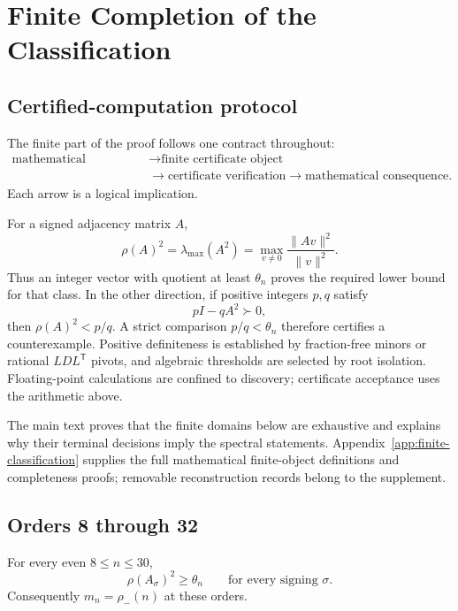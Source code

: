 \section{Finite Completion of the Classification}
\label{sec:finite-completion}

\subsection{Certified-computation protocol}
\label{subsec:exact-computation-protocol}

The finite part of the proof follows one contract throughout:
\[
\begin{aligned}
\text{mathematical reduction}
&\longrightarrow \text{finite certificate object}\\
&\longrightarrow \text{certificate verification}
\longrightarrow \text{mathematical consequence}.
\end{aligned}
\]
Each arrow is a logical implication.

For a signed adjacency matrix \(A\),
\[
\rho(A)^2=\lambda_{\max}(A^2)
=\max_{v\neq0}\frac{\|Av\|^2}{\|v\|^2}.
\]
Thus an integer vector with quotient at least \(\theta_n\) proves the
required lower bound for that class.  In the other direction, if positive
integers \(p,q\) satisfy
\[
pI-qA^2\succ0,
\]
then \(\rho(A)^2<p/q\). A strict comparison
\(p/q<\theta_n\) therefore certifies a counterexample.  Positive
definiteness is established by fraction-free minors or rational
\(LDL^{\mathsf T}\) pivots, and algebraic thresholds are selected by
root isolation. Floating-point calculations are confined to discovery;
certificate acceptance uses the arithmetic above.

The main text proves that the finite domains below are exhaustive and
explains why their terminal decisions imply the spectral statements.
Appendix~\ref{app:finite-classification} supplies the full mathematical
finite-object definitions and completeness proofs; removable reconstruction
records belong to the supplement.

\subsection{Orders 8 through 32}
\label{subsec:orders-8-32}

\begin{proposition}\label{prop:orders-8-30}
For every even \(8\leq n\leq30\),
\[
\rho(A_\sigma)^2\geq\theta_n
\qquad\text{for every signing }\sigma.
\]
Consequently \(m_n=\rho_-(n)\) at these orders.
\end{proposition}

